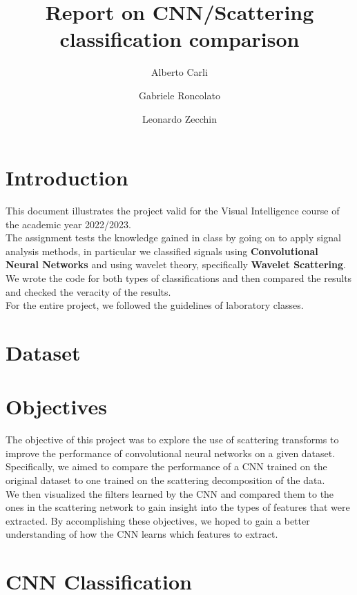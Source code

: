 \documentclass{report}
\title{Report on CNN/Scattering classification comparison}
\author{Alberto Carli \and Gabriele Roncolato \and Leonardo Zecchin }
\date{}
\begin{document}
\maketitle
\tableofcontents
\pagebreak

\chapter{Introduction}
This document illustrates the project valid for the Visual Intelligence course of the academic year 2022/2023. \\
The assignment tests the knowledge gained in class by going on to apply signal analysis methods, in particular we classified signals using \textbf{Convolutional Neural Networks} and using wavelet theory, specifically  \textbf{Wavelet Scattering}. \\
We wrote the code for both types of classifications and then compared the results and checked the veracity of the results. \\
For the entire project, we followed the guidelines of laboratory classes.


\chapter{Dataset}
\chapter{Objectives}
The objective of this project was to explore the use of scattering transforms to improve the performance of convolutional neural networks on a given dataset.\\
Specifically, we aimed to compare the performance of a CNN trained on the original dataset to one trained on the scattering decomposition of the data.\\

We then visualized the filters learned by the CNN and compared them to the ones in the scattering network to gain insight into the types of features that were extracted. 
By accomplishing these objectives, we hoped to gain a better understanding of how the CNN learns which features to extract.

\chapter{CNN Classification}
\end{document}
